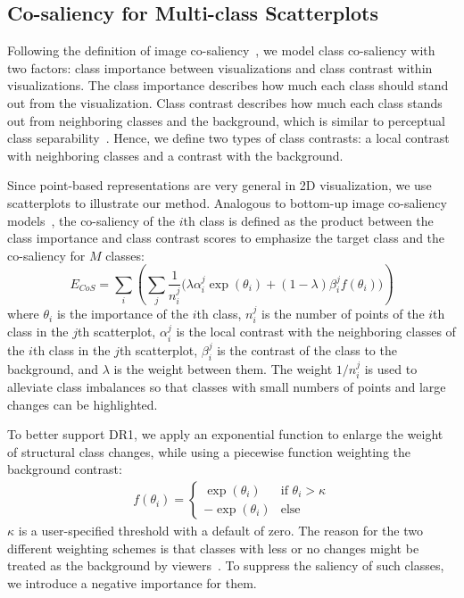 \subsection{Co-saliency for Multi-class Scatterplots }
Following the definition of image co-saliency~\cite{Jacobs10}, we model class co-saliency with two factors: class importance between visualizations and class contrast within visualizations. The class importance describes how much each class should stand out from the visualization.
Class contrast describes how much each class stands out from neighboring classes and the background,
which is similar to perceptual class separability~\cite{Aupetit02,Wang2018}. Hence,
we define two types of class contrasts: a local contrast with neighboring classes and a contrast with the background.

Since point-based representations are very general in 2D visualization, we use scatterplots to illustrate our method.
Analogous to bottom-up image co-saliency models~\cite{Jacobs10,Fu13}, the co-saliency of the $i$th class is defined as the product between the class importance and  class contrast scores to emphasize the target class and the co-saliency for $M$ classes:
\begin{equation}
E_{CoS} = \sum_i    \left(\sum_j \frac{1}{n^j_i}\bigg(\lambda \alpha^j_i\exp(\theta_i) + (1-\lambda) \beta^j_i f(\theta_i) \bigg) \right)
	\label{eq:cosaliency}
\end{equation}
where $\theta_i$ is the importance of the $i$th class,
$n^j_i$ is the number of points of the $i$th class in the $j$th scatterplot,
$\alpha^j_i$ is the local contrast with the neighboring classes of the $i$th class in the $j$th scatterplot, $\beta^j_i$  is the contrast of the class to the background, and $\lambda$ is the weight between them. The weight $1/{n^j_i}$  is used to alleviate class imbalances  so that  classes with small numbers of points and large changes can be highlighted.

To better support DR1, we apply an exponential function to enlarge the weight of structural class changes, while using a piecewise function weighting the background contrast:
\begin{align}
f(\theta_i) =  \left\{ \begin{array}{ll}
\exp(\theta_i) & \textrm{if $\theta_i>\kappa$}\\
-\exp(\theta_i) & \textrm{else}
\end{array} \right.
\label{eq:energyfunc}
\end{align}
$\kappa$ is a user-specified threshold with a default of zero. The reason for the two different weighting schemes is that classes with less or no changes might be treated as the background by viewers~\cite{zhang2018review}. To suppress the saliency of such classes, we introduce a negative importance for them.

